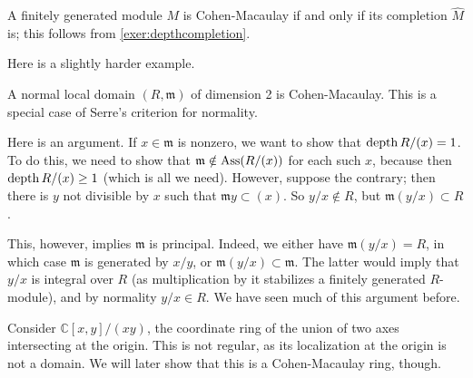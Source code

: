 \begin{example}
A finitely generated module $M$ is Cohen-Macaulay if and only if its
completion $\hat{M}$ is; this follows from \cref{exer:depthcompletion}.
\end{example} 

Here is a slightly harder example.
\begin{example} 
A normal local domain $(R, \mathfrak{m})$ of dimension 2 is Cohen-Macaulay. This is a special case
of Serre's criterion for normality.

Here is an argument. If $x \in \mathfrak{m}$ is nonzero, we want to
show that $\operatorname{depth} R/(x) = 1$.
To do this, we need to show that $\mathfrak{m} \notin \operatorname{Ass}(R/(x))$ for
each such $x$, because then $\operatorname{depth} R/(x) \geq 1$ (which is all we need).
However, suppose the contrary; then there is $y$ not divisible by $x$ such
that $\mathfrak{m}y \subset (x)$. 
So $y/x \notin R$, but $\mathfrak{m} (y/x) \subset R$. 

This, however, implies $\mathfrak{m}$ is principal. Indeed, we either have
$\mathfrak{m}(y/x) = R$, in which case  $\mathfrak{m}$ is generated by $x/y$,
or $\mathfrak{m}(y/x) \subset \mathfrak{m}$. The latter would imply
that $y/x$ is integral over $R$ (as multiplication by it stabilizes a
finitely generated $R$-module), and by normality $y/x \in R$. We have seen
much of this argument before. 
\end{example} 

\begin{example}
Consider $\mathbb{C}[x,y]/(xy)$, the coordinate ring of the
union of two axes
intersecting at the origin. This is not
regular, as its localization at the origin 
is not a domain. 
We will later show that this is a Cohen-Macaulay ring, though.
\begin{comment}
Indeed, we can project the associated variety
$X = V(xy)$
onto the affine line by adding the coordinates. This corresponds
to the map
\[ \mathbb{C}[z] \to \mathbb{C}[x,y]/(xy)  \]
sending $z \to x+y$. This makes $\mathbb{C}[x,y]/(xy)$ into a
free
$\mathbb{C}[z]$-module of rank two (with generators $1, x$), as
one can check.
So by the previous result (strictly speaking, its extension to
non-domains),
the ring in question is Cohen-Macaulay.
\end{comment}
\end{example}

